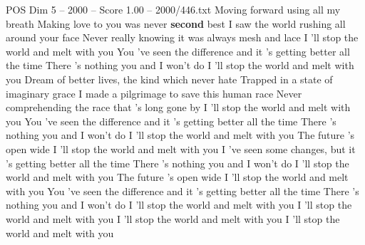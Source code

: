 \begin{textsample}{POS Dim 5 – 2000 – Score 1.00 – 2000/446.txt}  \label{ex:f5_pos_017}
Moving forward using all my breath Making love to you was never \textbf{second} best I saw the world rushing all around your face Never really knowing it was always mesh and lace I 'll stop the world and melt with you You 've seen the difference and it 's getting better all the time There 's nothing you and I won't do I 'll stop the world and melt with you Dream of better lives, the kind which never hate Trapped in a state of imaginary grace I made a pilgrimage to save this human race Never comprehending the race that 's long gone by I 'll stop the world and melt with you You 've seen the difference and it 's getting better all the time There 's nothing you and I won't do I 'll stop the world and melt with you The future 's open wide I 'll stop the world and melt with you I 've seen some changes, but it 's getting better all the time There 's nothing you and I won't do I 'll stop the world and melt with you The future 's open wide I 'll stop the world and melt with you You 've seen the difference and it 's getting better all the time There 's nothing you and I won't do I 'll stop the world and melt with you I 'll stop the world and melt with you I 'll stop the world and melt with you I 'll stop the world and melt with you

\end{textsample}
